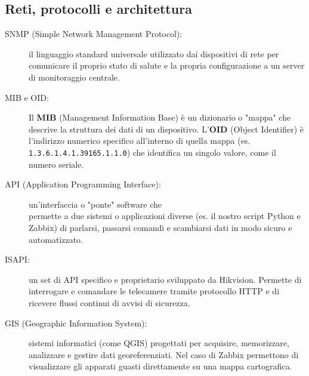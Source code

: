 \documentclass[12pt, a4paper]{report}
\begin{document}
{\subsection{Reti, protocolli e architettura}
\begin{description}
    \item[SNMP (Simple Network Management Protocol):] 
    il linguaggio standard universale utilizzato dai dispositivi di rete per comunicare
    il proprio stato di salute e la propria configurazione a un server di monitoraggio centrale.
    \item[MIB e OID:] Il \textbf{MIB} (Management Information Base) è un dizionario o "mappa" 
    che descrive la struttura dei dati di un dispositivo. 
    L'\textbf{OID} (Object Identifier) è l'indirizzo numerico specifico all'interno di quella mappa
    (es. \texttt{1.3.6.1.4.1.39165.1.1.0}) che identifica un singolo valore, come il numero seriale.
    \item[API (Application Programming Interface):] un'interfaccia o "ponte" software che \\
    permette a due sistemi o applicazioni diverse (es. il nostro script Python e Zabbix) 
    di parlarsi, passarsi comandi e scambiarsi dati in modo sicuro e automatizzato.
    \item[ISAPI:] un set di API specifico e proprietario sviluppato da Hikvision.
    Permette di interrogare e comandare le telecamere tramite protocollo HTTP
    e di ricevere flussi continui di avvisi di sicurezza.
    \item[GIS (Geographic Information System):] sistemi informatici (come QGIS) 
    progettati per acquisire, memorizzare, analizzare e gestire dati georeferenziati.
    Nel caso di Zabbix permettono di visualizzare gli apparati guasti direttamente su una mappa cartografica.
\end{description}
}
\end{document}
